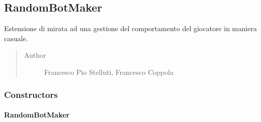 \documentclass[letterpaper,10pt,italian,openany,oneside]{sphinxmanual}
\begin{document}
\subsection{RandomBotMaker}
\label{\detokenize{test/it/unicam/cs/pa/mastermind/players/RandomBotMaker:randombotmaker}}\label{\detokenize{test/it/unicam/cs/pa/mastermind/players/RandomBotMaker::doc}}

\begin{fulllineitems}
\label{\detokenize{test/it/unicam/cs/pa/mastermind/players/RandomBotMaker:it.unicam.cs.pa.mastermind.players.RandomBotMaker}}
Estensione di  mirata ad una gestione del comportamento del giocatore in maniera casuale.
\begin{quote}\begin{description}
\item[{Author}] \leavevmode
Francesco Pio Stelluti, Francesco Coppola

\end{description}\end{quote}

\end{fulllineitems}



\subsubsection{Constructors}
\label{\detokenize{test/it/unicam/cs/pa/mastermind/players/RandomBotMaker:constructors}}

\paragraph{RandomBotMaker}
\label{\detokenize{test/it/unicam/cs/pa/mastermind/players/RandomBotMaker:id1}}

\begin{fulllineitems}
\label{\detokenize{test/it/unicam/cs/pa/mastermind/players/RandomBotMaker:it.unicam.cs.pa.mastermind.players.RandomBotMaker.RandomBotMaker(int)}}
\end{fulllineitems}
\end{document}
